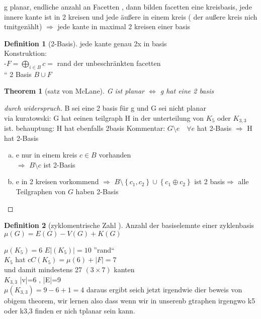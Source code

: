 \documentclass[a4paper]{article}
\newtheorem{theorem}{Theorem}[section]
\theoremstyle{definition}
\newtheorem{definition}{Definition}
\theoremstyle{remark}
\begin{document}
g planar, endliche anzahl an Facetten , dann bilden facetten eine kreisbasis, jede innere kante ist in 2 kreisen und jede äußere in einem kreis ( der außere kreis nich tmitgezählt)
$\Rightarrow $ jede kante in maximal 2 kreisen einer basis\\
\begin{definition}
  [2-Basis]	
  jede kante genau 2x in basis \\
  Konstruktion:\\
  -$F=\bigoplus_{i\in B} c=$ rand der unbeschränkten facetten\\
  `` 2 Basis $B\cup F$ 
\end{definition}
 \begin{theorem}
   [satz von McLane]
   G ist planar $\Leftrightarrow$ g hat eine 2 basis
 \end{theorem}
\begin{proof}
  [durch widerspruch]
  B sei eine 2 basis für g und G sei nicht planar\\
  via kuratowski: G hat eeinen teilgraph H in der unterteilung von $K_5$  oder $K_{3,3}$ ist.
  behauptung: H hat ebenfalls 2basis
  Kommentar: $G\setminus e \quad \forall e$ hat 2-Basis $\Rightarrow$ H hat 2-Basis
  \begin{enumerate}[(a)]
    \item e nur in einem kreis $c\in B$ vorhanden \\
      $\Rightarrow$ $B\setminus c$ ist 2-Basis
    \item e in 2 kreisen vorkommend $\Rightarrow$ $B\setminus \left\{ c_1,c_2 \right\}\cup \left\{ c_1\oplus c_2 \right\} $ ist 2 basis$\Rightarrow$ alle Teilgraphen von $G$ haben 2-Basis
  \end{enumerate}
\end{proof}

\begin{definition}
  [zyklomentrische Zahl ]
  Anzahl der basiselemnte einer zyklenbasis\\
  $\mu(G)=E(G)-V(G)+K(G)$
\end{definition}

$\mu(K_5)=6$ $ E|(K_5)|=10$ ''rand``\\
$ K_5$ hat c$C(K_5) =\mu(6)+|F|=7$\\
und damit mindestens 27 $(3\times 7) $ kanten\\
$K_{3,3}$ |v|=6 , |E|=9 \\
$\mu(K_{3,3})=9-6+1=4$
daraus ergibt seich jetzt irgendwie dier beweis von obigem theorem, wir lernen also dass wenn wir in unserenb gtraphen irgengwo k5 oder k3,3 finden er nich tplanar sein kann.
\end{document}
